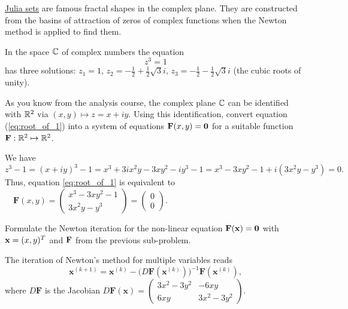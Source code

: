 
\begin{problem}

\href{http://en.wikipedia.org/wiki/Julia_set}{Julia sets} are famous fractal
shapes in the complex plane.  They are constructed from the basins of attraction
of zeros of complex functions when the Newton method is applied to find them.

In the space $\mathbb{C}$ of complex numbers the equation
\begin{equation}\label{eq:root_of_1} z^3=1 \end{equation}
has three solutions: $z_{1}=1$,
$z_{2}=-\frac{1}{2}+\frac{1}{2}\sqrt{3}i$,
$z_{3}=-\frac{1}{2}-\frac{1}{2}\sqrt{3}i$ (the cubic roots of unity).


\begin{subproblem}[2] \label{subprb:JuliaSet_1}
As you know from the analysis course, the complex plane $\mathbb{C}$ can be identified
with $\mathbb{R}^{2}$ via $(x,y)\mapsto z=x+iy$. Using this identification, convert
equation (\ref{eq:root_of_1}) into a system of equations ${\mathbf{F}}(x,y) = {\mathbf{0}}$ for a
suitable function ${\mathbf{F}}:\mathbb{R}^{2}\mapsto\mathbb{R}^{2}$.

\begin{solution}
We have $$z^3 - 1 =(x+iy)^3 -1 = x^3+3ix^2y-3xy^2-iy^3-1 = x^3-3xy^2-1+i(3x^2y-y^3)=0.$$
Thus, equation \eqref{eq:root_of_1} is equivalent to
$\quad \mathbf{F}(x,y)=\left(\begin{array}{c}x^3-3xy^2-1 \\ 3x^2y-y^3\end{array}\right)=\left(\begin{array}{c}0\\0\end{array}\right).$
\end{solution}
\end{subproblem}

\begin{subproblem}[3] \label{subprb:JuliaSet_2}
Formulate the Newton iteration  for the non-linear equation ${\mathbf{F}}({\mathbf{x}}) ={\mathbf{0}}$ with ${\mathbf{x}} = (x,y)^{T}$ and ${\mathbf{F}}$ from the previous sub-problem.

\begin{solution}
The iteration of Newton's method for multiple variables reads
$$\mathbf{x}^{(k+1)} = \mathbf{x}^{(k)}-\big(D\mathbf{F}(\mathbf{x}^{(k)})\big)^{-1}\mathbf{F}(\mathbf{x}^{(k)}),$$
where $D\mathbf{F}$ is the Jacobian
$D\mathbf{F}(\mathbf{x})=\left(\begin{array}{cc} 3x^2-3y^2&-6xy\\ 6xy&3x^2-3y^2 \end{array}\right)$.
\end{solution}
\end{subproblem}


\end{problem}
